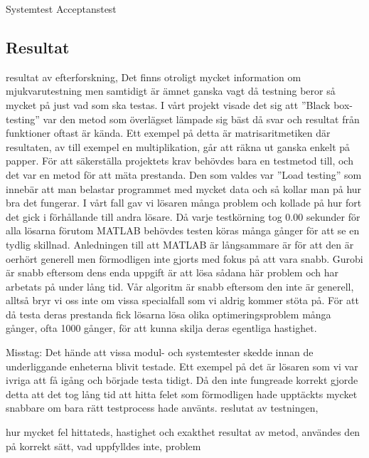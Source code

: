 	Systemtest
	Acceptanstest
	
	
	
	\subsection{Resultat}	
	resultat av efterforskning, \newline
	Det finns otroligt mycket information om mjukvarutestning men samtidigt är ämnet ganska vagt då testning beror så mycket på just vad som ska testas. I vårt projekt visade det sig att ''Black box-testing'' var den metod som överlägset lämpade sig bäst då svar och resultat från funktioner oftast är kända. Ett exempel på detta är matrisaritmetiken där resultaten, av till exempel en multiplikation, går att räkna ut ganska enkelt på papper. \newline
	För att säkerställa projektets krav behövdes bara en testmetod till, och det var en metod för att mäta prestanda. Den som valdes var ''Load testing'' som innebär att man belastar programmet med mycket data och så kollar man på hur bra det fungerar. I vårt fall gav vi lösaren många problem och kollade på hur fort det gick i förhållande till andra lösare. \newline
	Då varje testkörning tog 0.00 sekunder för alla lösarna förutom MATLAB behövdes testen köras många gånger för att se en tydlig skillnad. Anledningen till att MATLAB är långsammare är för att den är oerhört generell men förmodligen inte gjorts med fokus på att vara snabb. Gurobi är snabb eftersom dens enda uppgift är att lösa sådana här problem och har arbetats på under lång tid. Vår algoritm är snabb eftersom den inte är generell, alltså bryr vi oss inte om vissa specialfall som vi aldrig kommer stöta på. \newline
	För att då testa deras prestanda fick lösarna lösa olika optimeringsproblem många gånger, ofta 1000 gånger, för att kunna skilja deras egentliga hastighet.
		
	Misstag: Det hände att vissa modul- och systemtester skedde innan de underliggande enheterna blivit testade. Ett exempel på det är lösaren som vi var ivriga att få igång och började testa tidigt. Då den inte fungreade korrekt gjorde detta att det tog lång tid att hitta felet som förmodligen hade upptäckts mycket snabbare om bara rätt testprocess hade använts. 
	reslutat av testningen, \newline
	
	
	hur mycket fel hittateds, \newline
	hastighet och exakthet\newline
	resultat av metod, \newline
	användes den på korrekt sätt, \newline
	vad uppfylldes inte, \newline
	problem\newline
	
